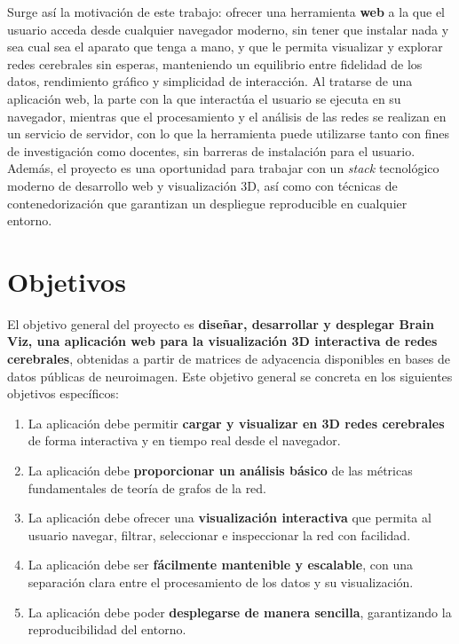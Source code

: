Surge así la motivación de este trabajo: ofrecer una herramienta \textbf{web} a la que el usuario
acceda desde cualquier navegador moderno, sin tener que instalar nada y sea cual sea el aparato que
tenga a mano, y que le permita visualizar y explorar redes cerebrales sin esperas, manteniendo un equilibrio entre fidelidad de los
datos, rendimiento gráfico y simplicidad de interacción. Al tratarse de una aplicación web, la parte
con la que interactúa el usuario se ejecuta en su navegador, mientras que el procesamiento y el
análisis de las redes se realizan en un servicio de servidor, con lo que la herramienta puede
utilizarse tanto con fines de investigación como docentes, sin barreras de instalación para el
usuario. Además, el proyecto es una oportunidad para trabajar con un \textit{stack} tecnológico
moderno de desarrollo web y visualización 3D, así como con técnicas de contenedorización que
garantizan un despliegue reproducible en cualquier entorno.

\section{Objetivos}

El objetivo general del proyecto es \textbf{diseñar, desarrollar y desplegar Brain Viz, una
aplicación web para la visualización 3D interactiva de redes cerebrales}, obtenidas a partir de
matrices de adyacencia disponibles en bases de datos públicas de neuroimagen. Este objetivo general
se concreta en los siguientes objetivos específicos:

\begin{enumerate}
	\item La aplicación debe permitir \textbf{cargar y visualizar en 3D redes cerebrales} de forma
		interactiva y en tiempo real desde el navegador.
	\item La aplicación debe \textbf{proporcionar un análisis básico} de las métricas fundamentales
		de teoría de grafos de la red.
	\item La aplicación debe ofrecer una \textbf{visualización interactiva} que permita al usuario
		navegar, filtrar, seleccionar e inspeccionar la red con facilidad.
	\item La aplicación debe ser \textbf{fácilmente mantenible y escalable}, con una separación clara
		entre el procesamiento de los datos y su visualización.
	\item La aplicación debe poder \textbf{desplegarse de manera sencilla}, garantizando la
		reproducibilidad del entorno.
\end{enumerate}

